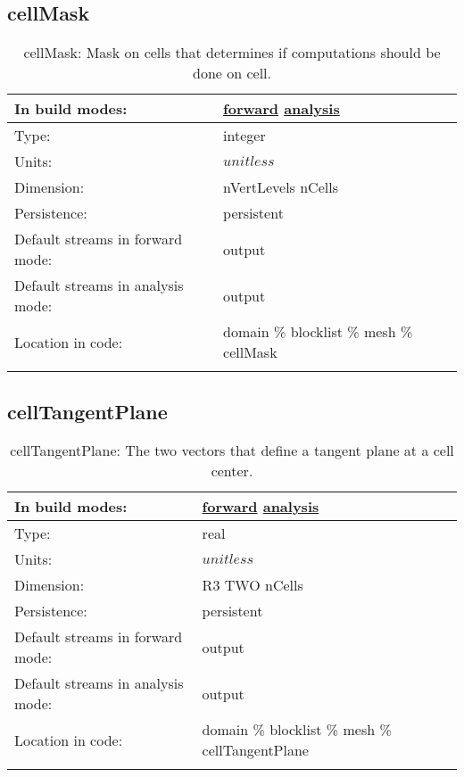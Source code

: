 \subsection[cellMask]{cellMask}
\label{subsec:var_sec_mesh_cellMask}
\begin{center}
\begin{longtable}{| p{2.0in} | p{4.0in} |}
        \hline 
        In build modes: & \hyperref[subsec:forward_var_tab_mesh]{forward} \hyperref[subsec:analysis_var_tab_mesh]{analysis} \\
        \hline 
        Type: & integer \\
        \hline 
        Units: & $unitless$ \\
        \hline 
        Dimension: & nVertLevels nCells \\
        \hline 
        Persistence: & persistent \\
        \hline 
		 Default streams in forward mode: &  output \\
        \hline 
		 Default streams in analysis mode: &  output \\
        \hline 
		 Location in code: & domain \% blocklist \% mesh \% cellMask \\
		 \hline 
    \caption{cellMask: Mask on cells that determines if computations should be done on cell.}
\end{longtable}
\end{center}
\subsection[cellTangentPlane]{cellTangentPlane}
\label{subsec:var_sec_mesh_cellTangentPlane}
\begin{center}
\begin{longtable}{| p{2.0in} | p{4.0in} |}
        \hline 
        In build modes: & \hyperref[subsec:forward_var_tab_mesh]{forward} \hyperref[subsec:analysis_var_tab_mesh]{analysis} \\
        \hline 
        Type: & real \\
        \hline 
        Units: & $unitless$ \\
        \hline 
        Dimension: & R3 TWO nCells \\
        \hline 
        Persistence: & persistent \\
        \hline 
		 Default streams in forward mode: &  output \\
        \hline 
		 Default streams in analysis mode: &  output \\
        \hline 
		 Location in code: & domain \% blocklist \% mesh \% cellTangentPlane \\
		 \hline 
    \caption{cellTangentPlane: The two vectors that define a tangent plane at a cell center.}
\end{longtable}
\end{center}
